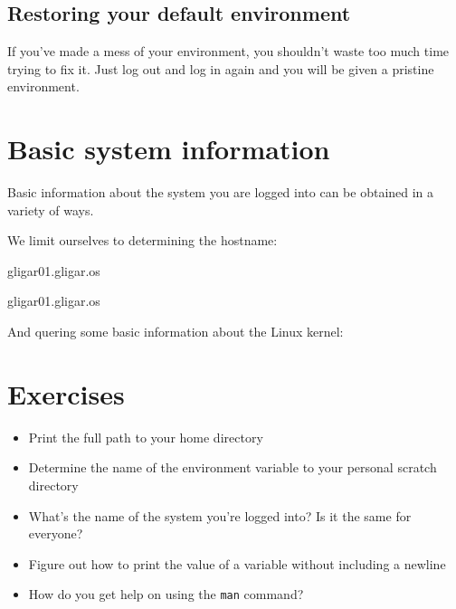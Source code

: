 \subsection{Restoring your default environment}

If you've made a mess of your environment, you shouldn't waste too much time
trying to fix it. Just log out and log in again and you will be given a
pristine environment.

\section{Basic system information}

Basic information about the system you are logged into can be obtained in a variety of ways.

We limit ourselves to determining the hostname:

\begin{prompt}
  gligar01.gligar.os

  gligar01.gligar.os
\end{prompt}

And quering some basic information about the Linux kernel:


\section{Exercises}

\begin{itemize}
    \item Print the full path to your home directory
    \item Determine the name of the environment variable to your personal scratch directory
    \item What's the name of the system you're logged into? Is it the same for everyone?
    \item Figure out how to print the value of a variable without including a newline
    \item How do you get help on using the \verb|man| command?
\end{itemize}
